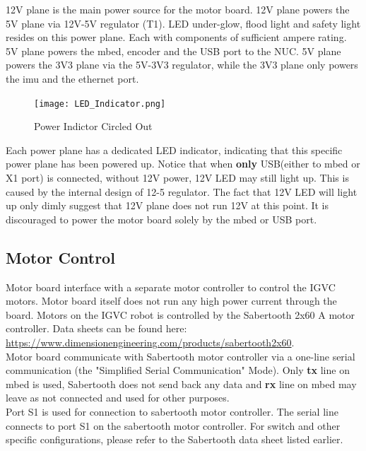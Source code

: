 \documentclass[letterpaper, 12pt]{article}
\begin{document}
12V plane is the main power source for the motor board. 12V plane powers the 5V plane via 12V-5V regulator (T1). LED under-glow, flood light and safety light resides on this power plane. Each with components of sufficient ampere rating. \\

5V plane powers the mbed, encoder and the USB port to the NUC. 5V plane powers the 3V3 plane via the 5V-3V3 regulator, while the 3V3 plane only powers the imu and the ethernet port. \\

\begin{figure}[h]
\centering
\texttt{[image: LED\_Indicator.png]}
\caption{Power Indictor Circled Out}
\end{figure}

Each power plane has a dedicated LED indicator, indicating that this specific power plane has been powered up. Notice that when \textbf{only} USB(either to mbed or X1 port) is connected, without 12V power, 12V LED may still light up. This is caused by the internal design of 12-5 regulator. The fact that 12V LED will light up only dimly suggest that 12V plane does not run 12V at this point. It is discouraged to power the motor board solely by the mbed or USB port.

\subsection{Motor Control}
Motor board interface with a separate motor controller to control the IGVC motors. Motor board itself does not run any high power current through the board. Motors on the IGVC robot is controlled by the Sabertooth 2x60 A motor controller. Data sheets can be found here: \url{https://www.dimensionengineering.com/products/sabertooth2x60}.\\

Motor board communicate with Sabertooth motor controller via a one-line serial communication (the "Simplified Serial Communication" Mode). Only \textbf{tx} line on mbed is used, Sabertooth does not send back any data and \textbf{rx} line on mbed may leave as not connected and used for other purposes.\\

Port S1 is used for connection to sabertooth motor controller. The serial line connects to port S1 on the sabertooth motor controller. For switch and other specific configurations, please refer to the Sabertooth data sheet listed earlier. \\
\end{document}
